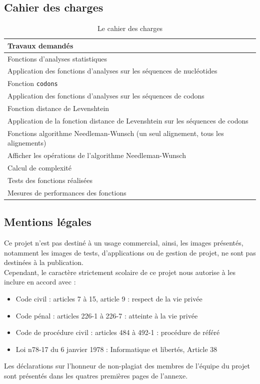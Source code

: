 \documentclass[12pt]{article}
\begin{document}
\subsection*{Cahier des charges}
    \begin{table}[!h]
        \centering
        \begin{tabular}{|l|}
            \hline
            Travaux demandés \\
            \hline
            Fonctions d'analyses statistiques \\
            Application des fonctions d'analyses sur les séquences de nucléotides \\
            Fonction \texttt{codons} \\
            Application des fonctions d'analyses sur les séquences de codons \\
            Fonction distance de Levenshtein \\
            Application de la fonction distance de Levenshtein sur les séquences de codons \\
            Fonctions algorithme Needleman-Wunsch (un seul alignement, tous les alignements) \\
            Afficher les opérations de l'algorithme Needleman-Wunsch \\
            Calcul de complexité \\
            Tests des fonctions réalisées \\
            Mesures de performances des fonctions \\
            \hline
        \end{tabular}
        \caption{Le cahier des charges}
        \label{tab:cdc}
    \end{table}

\subsection*{Mentions légales}
Ce projet n’est pas destiné à un usage commercial, ainsi, les images présentés, notamment les images de tests, d'applications ou de gestion de projet, ne sont pas destinées à la publication. \\
Cependant, le caractère strictement scolaire de ce projet nous autorise à les inclure en accord avec :
\begin{itemize}
\item Code civil : articles 7 à 15, article 9 : respect de la vie privée
\item Code pénal : articles 226-1 à 226-7 : atteinte à la vie privée
\item Code de procédure civil : articles 484 à 492-1 : procédure de référé
\item Loi n78-17 du 6 janvier 1978 : Informatique et libertés, Article 38
\end{itemize}
Les déclarations sur l’honneur de non-plagiat des membres de l’équipe du projet sont présentés dans les quatres premières pages de l'annexe.
\end{document}
